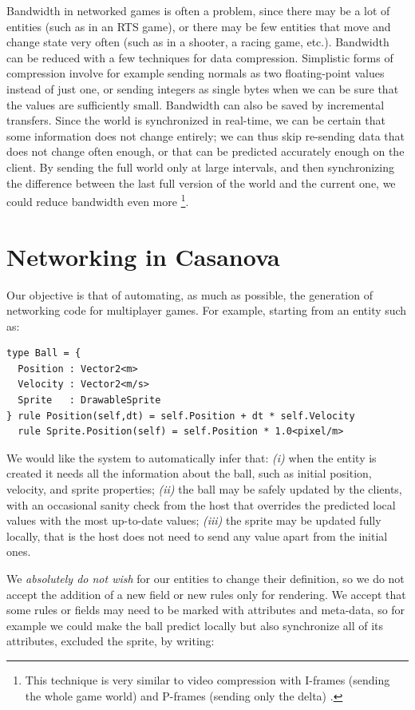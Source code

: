 Bandwidth in networked games is often a problem, since there may be a lot of entities (such as in an RTS game), or there may be few entities that move and change state very often (such as in a shooter, a racing game, etc.). Bandwidth can be reduced with a few techniques for data compression. Simplistic forms of compression involve for example sending normals as two floating-point values instead of just one, or sending integers as single bytes when we can be sure that the values are sufficiently small. Bandwidth can also be saved by incremental transfers. Since the world is synchronized in real-time, we can be certain that some information does not change entirely; we can thus skip re-sending data that does not change often enough, or that can be predicted accurately enough on the client. By sending the full world only at large intervals, and then synchronizing the difference between the last full version of the world and the current one, we could reduce bandwidth even more \footnote{This technique is very similar to video compression with I-frames (sending the whole game world) and P-frames (sending only the delta) \cite{APPENDIX_B_VIDEO_CODEC}.}.


\section{Networking in Casanova}
Our objective is that of automating, as much as possible, the generation of networking code for multiplayer games. For example, starting from an entity such as:

\begin{lstlisting}
type Ball = {
  Position : Vector2<m>
  Velocity : Vector2<m/s>
  Sprite   : DrawableSprite
} rule Position(self,dt) = self.Position + dt * self.Velocity
  rule Sprite.Position(self) = self.Position * 1.0<pixel/m>
\end{lstlisting}

We would like the system to automatically infer that: \textit{(i)} when the entity is created it needs all the information about the ball, such as initial position, velocity, and sprite properties; \textit{(ii)} the ball may be safely updated by the clients, with an occasional sanity check from the host that overrides the predicted local values with the most up-to-date values; \textit{(iii)} the sprite may be updated fully locally, that is the host does not need to send any value apart from the initial ones.

We \textit{absolutely do not wish} for our entities to change their definition, so we do not accept the addition of a new field or new rules only for rendering. We accept that some rules or fields may need to be marked with attributes and meta-data, so for example we could make the ball predict locally but also synchronize all of its attributes, excluded the sprite, by writing:

